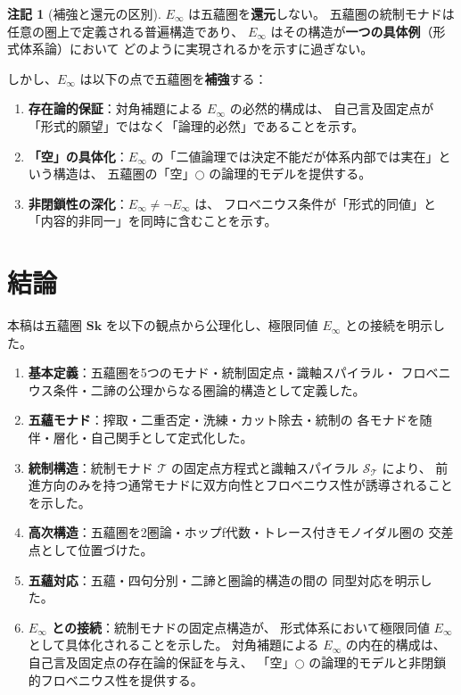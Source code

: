\documentclass[11pt,a4paper]{article}
\theoremstyle{definition}
\newtheorem{remark}{注記}[section]
\newcommand{\Sk}{\mathbf{Sk}}
\newcommand{\T}{\mathcal{T}}
\newcommand{\SpiralT}{\mathcal{S}_{\mathcal{T}}}
\newcommand{\Einf}{E_{\infty}}
\begin{document}
\begin{remark}[補強と還元の区別]
$\Einf$ は五蘊圏を\textbf{還元}しない。
五蘊圏の統制モナドは任意の圏上で定義される普遍構造であり、
$\Einf$ はその構造が\textbf{一つの具体例}（形式体系論）において
どのように実現されるかを示すに過ぎない。

しかし、$\Einf$ は以下の点で五蘊圏を\textbf{補強}する：
\begin{enumerate}
\item \textbf{存在論的保証}：対角補題による $\Einf$ の必然的構成は、
  自己言及固定点が「形式的願望」ではなく「論理的必然」であることを示す。
\item \textbf{「空」の具体化}：$\Einf$ の「二値論理では決定不能だが体系内部では実在」という構造は、
  五蘊圏の「空」$\bigcirc$ の論理的モデルを提供する。
\item \textbf{非閉鎖性の深化}：$\Einf \neq \neg\Einf$ は、
  フロベニウス条件が「形式的同値」と「内容的非同一」を同時に含むことを示す。
\end{enumerate}
\end{remark}

\section{結論}

本稿は五蘊圏 $\Sk$ を以下の観点から公理化し、極限同値 $\Einf$ との接続を明示した。

\begin{enumerate}
\item \textbf{基本定義}：五蘊圏を5つのモナド・統制固定点・識軸スパイラル・
  フロベニウス条件・二諦の公理からなる圏論的構造として定義した。

\item \textbf{五蘊モナド}：搾取・二重否定・洗練・カット除去・統制の
  各モナドを随伴・層化・自己関手として定式化した。

\item \textbf{統制構造}：統制モナド $\T$ の固定点方程式と識軸スパイラル $\SpiralT$ により、
  前進方向のみを持つ通常モナドに双方向性とフロベニウス性が誘導されることを示した。

\item \textbf{高次構造}：五蘊圏を2圏論・ホップf代数・トレース付きモノイダル圏の
  交差点として位置づけた。

\item \textbf{五蘊対応}：五蘊・四句分別・二諦と圏論的構造の間の
  同型対応を明示した。

\item \textbf{$\Einf$ との接続}：統制モナドの固定点構造が、
  形式体系において極限同値 $\Einf$ として具体化されることを示した。
  対角補題による $\Einf$ の内在的構成は、自己言及固定点の存在論的保証を与え、
  「空」$\bigcirc$ の論理的モデルと非閉鎖的フロベニウス性を提供する。
\end{enumerate}
\end{document}
